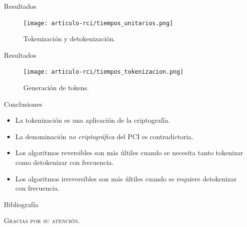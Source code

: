 \documentclass{beamer}
\begin{document}
  \begin{frame}{Resultados}
    \begin{figure}[H]
      \centering
      \texttt{[image: articulo-rci/tiempos\_unitarios.png]}
        \caption{Tokenización y detokenización.}
    \end{figure}
  \end{frame}

  \begin{frame}{Resultados}
    \begin{figure}[H]
      \centering
      \texttt{[image: articulo-rci/tiempos\_tokenizacion.png]}
        \caption{Generación de tokens.}
    \end{figure}
  \end{frame}

  \begin{frame}{Conclusiones}
    \begin{itemize}
      \item La tokenización es una aplicación de la criptografía.
      \item La denominación \textit{no criptográfica} del PCI es contradictoria.
      \item Los algoritmos reversibles son más últiles cuando se necesita tanto
        tokenizar como detokenizar con frecuencia.
      \item Los algoritmos irreversibles son más últiles cuando se requiere
        detokenizar con frecuencia.
    \end{itemize}
  \end{frame}

  \begin{frame}[allowframebreaks]{Bibliografía}
    \printbibliography
  \end{frame}

  \begin{frame}{}
    \centering \Huge
    \textsc{Gracias por su atención.}
  \end{frame}

  \setlength{\parskip}{0.0em}

  {
  \frame{\titlepage}}
\end{document}
